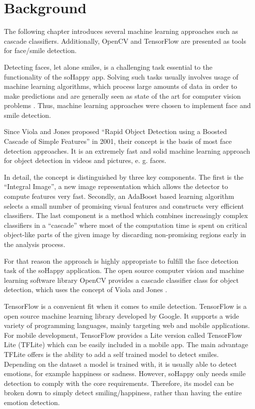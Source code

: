 \section{Background} \label{sec:background}
The following chapter introduces several machine learning approaches such as cascade
classifiers. Additionally, OpenCV and TensorFlow are presented as tools for face/smile
detection.

Detecting faces, let alone smiles, is a challenging task essential to the functionality of the soHappy app. Solving such tasks usually involves usage of machine learning algorithms, which process large amounts of data in order to make predictions and are generally seen as state of the art for computer vision problems \cite{foundations_ml}. Thus, machine learning approaches were chosen to implement face and smile detection.

Since Viola and Jones proposed ``Rapid Object Detection using a Boosted Cascade of Simple Features'' \cite{viola_jones} in 2001, their concept is the basis of most face detection approaches.
It is an extremely fast and solid machine learning approach for object detection in videos and pictures, e. g. faces.

In detail, the concept is distinguished by three key components.
The first is the ``Integral Image'', a new image representation which allows the detector to compute features very fast.
Secondly, an AdaBoost based learning algorithm selects a small number of promising visual features and constructs very efficient classifiers.
The last component is a method which combines increasingly complex classifiers in a ``cascade'' where most of the computation time is spent on critical object-like parts of the given image by discarding non-promising regions early in the analysis process.

For that reason the approach is highly appropriate to fulfill the face detection task of the soHappy application.
The open source computer vision and machine learning software library OpenCV provides a cascade classifier class for object detection, which uses the concept of Viola and Jones \cite{opencv_cascade_classifier}.

TensorFlow \cite{tensorflow} is a convenient fit when it comes to smile detection.
TensorFlow is a open source machine learning library developed by Google.
It supports a wide variety of programming languages, mainly targeting web and mobile applications.
For mobile development, TensorFlow provides a Lite version called TensorFlow Lite (TFLite) which can be easily included in a mobile app.
The main advantage TFLite offers is the ability to add a self trained model to detect smiles.
Depending on the dataset a model is trained with, it is usually able to detect emotions, for example happiness or sadness.
However, soHappy only needs smile detection to comply with the core requirements.
Therefore, its model can be broken down to simply detect smiling/happiness, rather than having the entire emotion detection.

